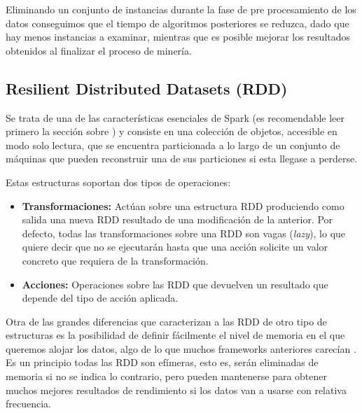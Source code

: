 Eliminando un conjunto de instancias durante la fase de pre procesamiento de los datos conseguimos que el tiempo de algoritmos posteriores se reduzca, dado que hay menos instancias a examinar, mientras que es posible mejorar los resultados obtenidos al finalizar el proceso de minería. \cite{IntroInstanceSelect}


\subsection{Resilient Distributed Datasets (RDD)}

Se trata de una de las características esenciales de Spark (es recomendable leer primero la sección sobre ) y consiste en una colección de objetos, accesible en modo solo lectura, que se encuentra particionada a lo largo de un conjunto de máquinas que pueden reconstruir una de sus particiones si esta llegase a perderse. \cite{SparkPaper}

Estas estructuras soportan dos tipos de operaciones:

\begin{itemize}
	\item \textbf{Transformaciones:} Actúan sobre una estructura RDD produciendo como salida una nueva RDD resultado de una modificación de la anterior. Por defecto, todas las transformaciones sobre una RDD son vagas (\textit{lazy}), lo que quiere decir que no se ejecutarán hasta que una acción solicite un valor concreto que requiera de la transformación. \cite{SparkPaper}
	\item \textbf{Acciones:} Operaciones sobre las RDD que devuelven un resultado que depende del tipo de acción aplicada.
\end{itemize}

Otra de las grandes diferencias que caracterizan a las RDD de otro tipo de estructuras es la posibilidad de definir fácilmente el nivel de memoria en el que queremos alojar los datos, algo de lo que muchos frameworks anteriores carecían \cite{RDDPaper}. Es un principio todas las RDD son efímeras, esto es, serán eliminadas de memoria si no se indica lo contrario, pero pueden mantenerse para obtener muchos mejores resultados de rendimiento si los datos van a usarse con relativa frecuencia.






